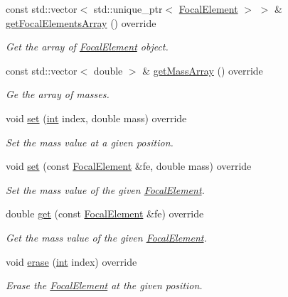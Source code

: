\begin{DoxyCompactItemize}
const std\+::vector$<$ std\+::unique\+\_\+ptr$<$ \hyperlink{classFocalElement}{Focal\+Element} $>$ $>$ \& \hyperlink{classGenericFocalElementContainer_a2db442b704235b974d96cd5670ab1630}{get\+Focal\+Elements\+Array} () override
\begin{DoxyCompactList}\small\item\em Get the array of \hyperlink{classFocalElement}{Focal\+Element} object. \end{DoxyCompactList}\item 
const std\+::vector$<$ double $>$ \& \hyperlink{classGenericFocalElementContainer_a0ae8e8ad18f3d8c09db25688f2da684b}{get\+Mass\+Array} () override
\begin{DoxyCompactList}\small\item\em Ge the array of masses. \end{DoxyCompactList}\item 
void \hyperlink{classGenericFocalElementContainer_ae764ae489ed94b366de805a3a45278b9}{set} (\hyperlink{CMakeCache_8txt_a79a3d8790b2588b09777910863574e09}{int} index, double mass) override
\begin{DoxyCompactList}\small\item\em Set the mass value at a given position. \end{DoxyCompactList}\item 
void \hyperlink{classGenericFocalElementContainer_a33d167fa35d3e19ec214560c281681ea}{set} (const \hyperlink{classFocalElement}{Focal\+Element} \&fe, double mass) override
\begin{DoxyCompactList}\small\item\em Set the mass value of the given \hyperlink{classFocalElement}{Focal\+Element}. \end{DoxyCompactList}\item 
double \hyperlink{classGenericFocalElementContainer_a3a9fd25120f480a33770e52d198ecc33}{get} (const \hyperlink{classFocalElement}{Focal\+Element} \&fe) override
\begin{DoxyCompactList}\small\item\em Get the mass value of the given \hyperlink{classFocalElement}{Focal\+Element}. \end{DoxyCompactList}\item 
void \hyperlink{classGenericFocalElementContainer_a123f043d029c636824e4ca8153cd6aea}{erase} (\hyperlink{CMakeCache_8txt_a79a3d8790b2588b09777910863574e09}{int} index) override
\begin{DoxyCompactList}\small\item\em Erase the \hyperlink{classFocalElement}{Focal\+Element} at the given position. \end{DoxyCompactList}\item 

\end{DoxyCompactItemize}
